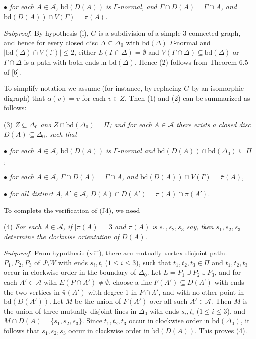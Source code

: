 \hspace*{12pt}$\bullet$ \textit{for each $A \in \mathcal{A}$, $\text{bd}(D(A))$ is $\Gamma$-normal, and $\Gamma \cap D(A) = \Gamma \cap A$, and $\text{bd}(D(A)) \cap V(\Gamma) = \bar{\pi}(A)$.}

\textit{Subproof.} By hypothesis (i), $G$ is a subdivision of a simple 3-connected graph, and hence for every closed disc $\Delta \subseteq \Delta_0$ with $\text{bd}(\Delta)$ $\Gamma$-normal and $|\text{bd}(\Delta) \cap V(\Gamma)| \le 2$, either $E(\Gamma \cap \Delta) = \emptyset$ and $V(\Gamma \cap \Delta) \subseteq \text{bd}(\Delta)$ or $\Gamma \cap \Delta$ is a path with both ends in $\text{bd}(\Delta)$. Hence (2) follows from Theorem 6.5 of [6].

To simplify notation we assume (for instance, by replacing $G$ by an isomorphic digraph) that $\alpha(v) = v$ for each $v \in Z$. Then (1) and (2) can be summarized as follows:

\hspace*{12pt}(3) \textit{$Z \subseteq \Delta_0$ and $Z \cap \text{bd}(\Delta_0) = \Pi$; and for each $A \in \mathcal{A}$ there exists a closed disc $D(A) \subseteq \Delta_0$, such that}

\hspace*{12pt}$\bullet$ \textit{for each $A \in \mathcal{A}$, $\text{bd}(D(A))$ is $\Gamma$-normal and $\text{bd}(D(A)) \cap \text{bd}(\Delta_0) \subseteq \Pi$,}

\hspace*{12pt}$\bullet$ \textit{for each $A \in \mathcal{A}$, $\Gamma \cap D(A) = \Gamma \cap A$, and $\text{bd}(D(A)) \cap V(\Gamma) = \bar{\pi}(A)$,}

\hspace*{12pt}$\bullet$ \textit{for all distinct $A, A' \in \mathcal{A}$, $D(A) \cap D(A') = \bar{\pi}(A) \cap \bar{\pi}(A')$.}

To complete the verification of (J4), we need

\hspace*{12pt}(4) \textit{For each $A \in \mathcal{A}$, if $|\bar{\pi}(A)| = 3$ and $\pi(A)$ is $s_1, s_2, s_3$ say, then $s_1, s_2, s_3$ determine the clockwise orientation of $D(A)$.}

\textit{Subproof.} From hypothesis (viii), there are mutually vertex-disjoint paths $P_1, P_2, P_3$ of $J \setminus W$ with ends $s_i, t_i$ ($1 \le i \le 3$), such that $t_1, t_2, t_3 \in \Pi$ and $t_1, t_2, t_3$ occur in clockwise order in the boundary of $\Delta_0$. Let $L = P_1 \cup P_2 \cup P_3$, and for each $A' \in \mathcal{A}$ with $E(P \cap A') \ne \emptyset$, choose a line $F(A') \subseteq D(A')$ with ends the two vertices in $\bar{\pi}(A')$ with degree 1 in $P \cap A'$, and with no other point in $\text{bd}(D(A'))$. Let $M$ be the union of $F(A')$ over all such $A' \in \mathcal{A}$. Then $M$ is the union of three mutually disjoint lines in $\Delta_0$ with ends $s_i, t_i$ ($1 \le i \le 3$), and $M \cap D(A) = \{s_1, s_2, s_3\}$. Since $t_1, t_2, t_3$ occur in clockwise order in $\text{bd}(\Delta_0)$, it follows that $s_1, s_2, s_3$ occur in clockwise order in $\text{bd}(D(A))$. This proves (4).

